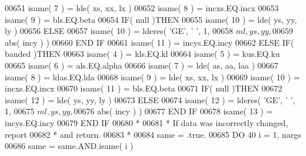 \begin{DoxyCode}
00651                                  isame( 7 ) = lde( xs, xx, lx )
00652                                  isame( 8 ) = incxs.EQ.incx
00653                                  isame( 9 ) = bls.EQ.beta
00654                                  \textcolor{keywordflow}{IF}( null )\textcolor{keywordflow}{THEN}
00655                                     isame( 10 ) = lde( ys, yy, ly )
00656                                  \textcolor{keywordflow}{ELSE}
00657                                     isame( 10 ) = lderes( \textcolor{stringliteral}{'GE'}, \textcolor{stringliteral}{' '}, 1,
00658      $                                            ml, ys, yy,
00659      $                                            abs( incy ) )
00660 \textcolor{keywordflow}{                                 END IF}
00661                                  isame( 11 ) = incys.EQ.incy
00662                               \textcolor{keywordflow}{ELSE} \textcolor{keywordflow}{IF}( banded )\textcolor{keywordflow}{THEN}
00663                                  isame( 4 ) = kls.EQ.kl
00664                                  isame( 5 ) = kus.EQ.ku
00665                                  isame( 6 ) = als.EQ.alpha
00666                                  isame( 7 ) = lde( as, aa, laa )
00667                                  isame( 8 ) = ldas.EQ.lda
00668                                  isame( 9 ) = lde( xs, xx, lx )
00669                                  isame( 10 ) = incxs.EQ.incx
00670                                  isame( 11 ) = bls.EQ.beta
00671                                  \textcolor{keywordflow}{IF}( null )\textcolor{keywordflow}{THEN}
00672                                     isame( 12 ) = lde( ys, yy, ly )
00673                                  \textcolor{keywordflow}{ELSE}
00674                                     isame( 12 ) = lderes( \textcolor{stringliteral}{'GE'}, \textcolor{stringliteral}{' '}, 1,
00675      $                                            ml, ys, yy,
00676      $                                            abs( incy ) )
00677 \textcolor{keywordflow}{                                 END IF}
00678                                  isame( 13 ) = incys.EQ.incy
00679 \textcolor{keywordflow}{                              END IF}
00680 \textcolor{comment}{*}
00681 \textcolor{comment}{*                             If data was incorrectly changed, report}
00682 \textcolor{comment}{*                             and return.}
00683 \textcolor{comment}{*}
00684                               same = .true.
00685                               \textcolor{keywordflow}{DO} 40 i = 1, nargs
00686                                  same = same.AND.isame( i )

\end{DoxyCode}
